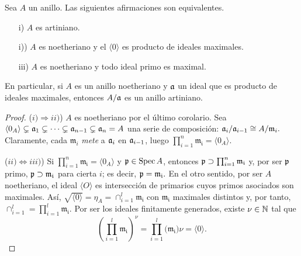 \documentclass[../main.tex]{subfiles}
\begin{document}
\begin{proposition}
Sea $A$ un anillo. Las siguientes afirmaciones son equivalentes.
\begin{itemize}
    \item[i)] $A$ es artiniano.
    \item[i))] $A$ es noetheriano y el $\langle 0\rangle$ es producto de ideales maximales.
    \item[iii)] $A$ es noetheriano y todo ideal primo es maximal.
\end{itemize}
En particular, si $A$ es un anillo noetheriano y $\mathfrak{a}$ un ideal que es producto de ideales maximales, entonces $A/\mathfrak{a}$ es un anillo artiniano.
\end{proposition}

\begin{proof} ($i)\Rightarrow ii)$) $A$ es noetheriano por el último corolario. Sea $\langle 0_A\rangle\subsetneq \mathfrak{a}_1\subsetneq\cdots\subsetneq\mathfrak{a}_{n-1}\subsetneq\mathfrak{a}_n=A$ una serie de composición: $\mathfrak{a}_i/\mathfrak{a}_{i-1}\cong A/\mathfrak{m}_i.$ Claramente, cada $\mathfrak{m}_i$ \textit{mete} a $\mathfrak{a}_i$ en $\mathfrak{a}_{i-1}$, luego $\prod_{i=1}^n\mathfrak{m_i}=\langle 0_A\rangle.$

($ii)\Leftrightarrow iii)$) Si $\prod_{i=1}^n\mathfrak{m_i}=\langle 0_A\rangle$ y $\mathfrak{p}\in\operatorname{Spec} A$, entonces $\mathfrak{p}\supset \prod_{i=1}^n\mathfrak{m_i}$ y, por ser $\mathfrak{p}$ primo, $\mathfrak{p}\supset\mathfrak{m_i}$ para cierta $i$; es decir, $\mathfrak{p}=\mathfrak{m_i}.$ En el otro sentido, por ser $A$ noetheriano, el ideal $\langle O\rangle$ es intersección de primarios cuyos primos asociados son maximales. Así, $\sqrt{\langle 0\rangle}=\eta_A=\cap_{i=1}^l\mathfrak{m_i}$ con $\mathfrak{m_i}$ maximales distintos y, por tanto, $\cap_{i=1}^l=\prod_{i=1}^l\mathfrak{m_i}.$ Por ser los ideales finitamente generados, existe $\nu\in\mathbb{N}$ tal que
$$\left(\prod_{i=1}^l\mathfrak{m_i}\right)^\nu=\prod_{i=1}^l(\mathfrak{m_i)\nu}=\langle 0\rangle.$$


\end{proof}
\end{document}
